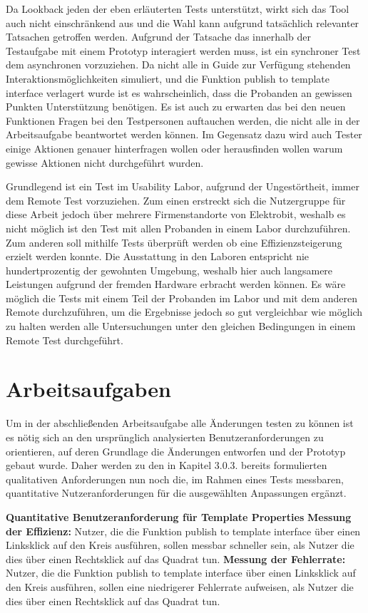 Da Lookback jeden der eben erläuterten Tests unterstützt, wirkt sich das Tool auch nicht einschränkend aus und die Wahl kann aufgrund tatsächlich relevanter Tatsachen getroffen werden.
Aufgrund der Tatsache das innerhalb der Testaufgabe mit einem Prototyp interagiert werden muss, ist ein synchroner Test dem asynchronen vorzuziehen.
Da nicht alle in Guide zur Verfügung stehenden Interaktionsmöglichkeiten simuliert, und die Funktion \glqq publish to template interface\grqq{} verlagert wurde ist es wahrscheinlich, dass die Probanden an gewissen Punkten Unterstützung benötigen.
Es ist auch zu erwarten das bei den neuen Funktionen Fragen bei den Testpersonen auftauchen werden, die nicht alle in der Arbeitsaufgabe beantwortet werden können.
Im Gegensatz dazu wird auch Tester einige Aktionen genauer hinterfragen wollen oder herausfinden wollen warum gewisse Aktionen nicht durchgeführt wurden.

Grundlegend ist ein Test im Usability Labor, aufgrund der Ungestörtheit, immer dem Remote Test vorzuziehen.
Zum einen erstreckt sich die Nutzergruppe für diese Arbeit  jedoch über mehrere Firmenstandorte von Elektrobit, weshalb es nicht möglich ist den Test mit allen Probanden in einem Labor durchzuführen.
Zum anderen soll mithilfe Tests überprüft werden ob eine Effizienzsteigerung erzielt werden konnte.
Die Ausstattung in den Laboren entspricht nie hundertprozentig der gewohnten Umgebung, weshalb hier auch langsamere Leistungen aufgrund der fremden Hardware erbracht werden können.
Es wäre möglich die Tests mit einem Teil der Probanden im Labor und mit dem anderen Remote durchzuführen, um die Ergebnisse jedoch so gut vergleichbar wie möglich zu halten werden alle Untersuchungen unter den gleichen Bedingungen in einem Remote Test durchgeführt.

\section{Arbeitsaufgaben}

Um in der abschließenden Arbeitsaufgabe alle Änderungen testen zu können ist es nötig sich an den ursprünglich analysierten Benutzeranforderungen zu orientieren, auf deren Grundlage die Änderungen entworfen und der Prototyp gebaut wurde.
Daher werden zu den in Kapitel 3.0.3. bereits formulierten qualitativen Anforderungen nun noch die, im Rahmen eines Tests messbaren, quantitative Nutzeranforderungen für die ausgewählten Anpassungen ergänzt.

\textbf{Quantitative Benutzeranforderung für Template Properties}\newline
\textbf{Messung der Effizienz:}
Nutzer, die die Funktion \glqq publish to template interface\grqq{} über einen Linksklick auf den Kreis ausführen, sollen messbar schneller sein, als Nutzer die dies über einen Rechtsklick auf das Quadrat tun. \newline
\textbf{Messung der Fehlerrate:} 
Nutzer, die die Funktion \glqq publish to template interface\grqq{} über einen Linksklick auf den Kreis ausführen, sollen eine niedrigerer Fehlerrate aufweisen, als Nutzer die dies über einen Rechtsklick auf das Quadrat tun.

